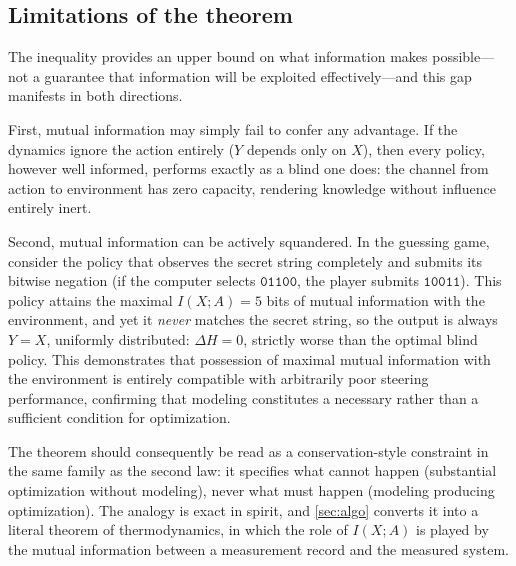 \documentclass[11pt]{article}
\begin{document}
\subsection{Limitations of the theorem}
\label{sec:tlcaveats}

The inequality provides an upper bound on what information makes possible---not a guarantee that information will be exploited effectively---and this gap manifests in both directions.

First, mutual information may simply fail to confer any advantage. If the dynamics ignore the action entirely ($Y$ depends only on $X$), then every policy, however well informed, performs exactly as a blind one does: the channel from action to environment has zero capacity, rendering knowledge without influence entirely inert.

Second, mutual information can be actively squandered. In the guessing game, consider the policy that observes the secret string completely and submits its bitwise negation (if the computer selects $\texttt{01100}$, the player submits $\texttt{10011}$). This policy attains the maximal $I(X;A) = 5$ bits of mutual information with the environment, and yet it \emph{never} matches the secret string, so the output is always $Y = X$, uniformly distributed: $\Delta H = 0$, strictly worse than the optimal blind policy. This demonstrates that possession of maximal mutual information with the environment is entirely compatible with arbitrarily poor steering performance, confirming that modeling constitutes a necessary rather than a sufficient condition for optimization.

The theorem should consequently be read as a conservation-style constraint in the same family as the second law: it specifies what cannot happen (substantial optimization without modeling), never what must happen (modeling producing optimization). The analogy is exact in spirit, and \cref{sec:algo} converts it into a literal theorem of thermodynamics, in which the role of $I(X;A)$ is played by the mutual information between a measurement record and the measured system.
\end{document}
